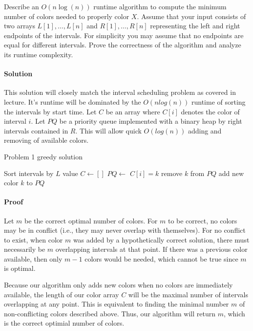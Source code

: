 \documentclass[11pt]{article}
\begin{document}
Describe an $O(n \log(n))$ runtime algorithm to compute the minimum number of colors needed to properly color \(X\). Assume that your input consists of two arrays \(L[1], \dots, L[n]\) and \(R[1],\dots, R[n]\) representing the left and right endpoints of the intervals. For simplicity you may assume that no endpoints are equal for different intervals. Prove the correctness of the algorithm and analyze its runtime complexity.

\paragraph{Solution}
This solution will closely match the interval scheduling problem as covered in
lecture. It's runtime will be dominated by the $O(nlog(n))$ runtime of sorting
the intervals by start time. Let $C$ be an array where
$C[i]$ denotes the color of interval $i$. Let $PQ$ be a priority queue
implemented with a binary heap by right intervals contained in $R$. This will
allow quick $O(log(n))$ adding and removing of available colors.

\begin{algorithm}
\caption{Problem 1 greedy solution}
\begin{algorithmic}[1]
    \State Sort intervals by $L$ value
    \State $C \leftarrow []$
    \State $PQ \leftarrow $ 
            \State $C[i] = k$
            \State remove $k$ from $PQ$
        \Else
            \State add new color $k$ to $PQ$
        \EndIf    
    \EndFor
    \State \Return {}
\EndProcedure 
\end{algorithmic}
\end{algorithm}

\paragraph{Proof}
Let $m$ be the correct optimal number of colors. For $m$ to be correct, no
colors may be in conflict (i.e., they may never overlap with themselves). For
no conflict to exist, when color $m$ was added by a hypothetically correct
solution, there must necessarily be $m$ overlapping intervals at that point. If
there was a previous color available, then only $m-1$ colors would be needed,
which cannot be true since $m$ is optimal.

Because our algorithm only adds new colors when no colors are immediately
available, the length of our color array $C$ will be the maximal number of
intervals overlapping at any point. This is equivalent to finding the minimal
number $m$ of non-conflicting colors described above. Thus, our algorithm will
return $m$, which is the correct optimial number of colors.
\end{document}
